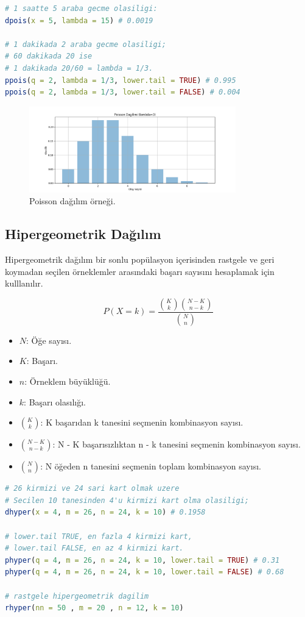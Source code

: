 \begin{lstlisting}[language=R]
# 1 saatte 5 araba gecme olasiligi:
dpois(x = 5, lambda = 15) # 0.0019

# 1 dakikada 2 araba gecme olasiligi;
# 60 dakikada 20 ise
# 1 dakikada 20/60 = lambda = 1/3.
ppois(q = 2, lambda = 1/3, lower.tail = TRUE) # 0.995
ppois(q = 2, lambda = 1/3, lower.tail = FALSE) # 0.004
\end{lstlisting}

\begin{figure}[h]
    \centering
    \includegraphics[width=0.8\textwidth]{images/poisson_distribution.png}
    \caption{Poisson dağılım örneği.}
    \label{fig:enter-label}
\end{figure}

\subsection{Hipergeometrik  Dağılım}
Hipergeometrik dağılım bir sonlu popülasyon içerisinden rastgele ve geri koymadan seçilen örneklemler arasındaki başarı sayısını hesaplamak için kulllanılır. 

\[
P(X = k) = \frac{\binom{K}{k} \binom{N-K}{n-k}}{\binom{N}{n}}
\]

\begin{itemize}
	\item $N$: Öğe sayısı.
	\item $K$: Başarı.
	\item $n$: Örneklem büyüklüğü.
	\item $k$: Başarı olasılığı.
	\item $\binom{K}{k}$: K başarıdan k tanesini seçmenin kombinasyon sayısı.
	\item $\binom{N-K}{n-k}$: N - K başarısızlıktan n - k tanesini seçmenin kombinasyon sayısı.
	\item $\binom{N}{n}$: N öğeden n tanesini seçmenin toplam kombinasyon sayısı.
\end{itemize}

\begin{lstlisting}[language=R]
# 26 kirmizi ve 24 sari kart olmak uzere
# Secilen 10 tanesinden 4'u kirmizi kart olma olasiligi;
dhyper(x = 4, m = 26, n = 24, k = 10) # 0.1958

# lower.tail TRUE, en fazla 4 kirmizi kart,
# lower.tail FALSE, en az 4 kirmizi kart.
phyper(q = 4, m = 26, n = 24, k = 10, lower.tail = TRUE) # 0.31
phyper(q = 4, m = 26, n = 24, k = 10, lower.tail = FALSE) # 0.68

# rastgele hipergeometrik dagilim
rhyper(nn = 50 , m = 20 , n = 12, k = 10)
\end{lstlisting}

\newpage 